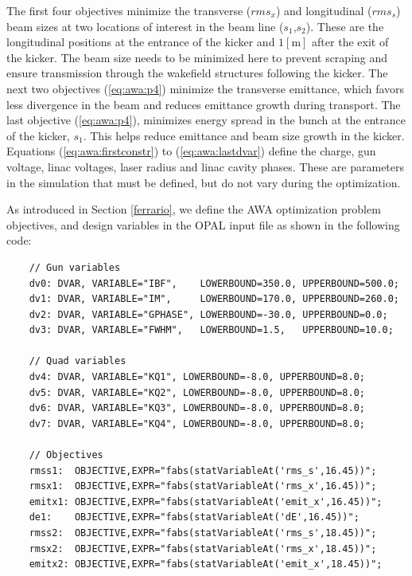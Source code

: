 The first four objectives minimize the transverse ($rms_x$) and longitudinal ($rms_s$) 
beam sizes at two locations of interest in the beam line ($s_1$,$s_2$). 
These are the longitudinal positions at the entrance of the kicker and 
$1[\text{m}]$ after the exit of the kicker. The beam size needs to be minimized
here to prevent scraping and ensure transmission through the wakefield structures 
following the kicker. The next two objectives (\ref{eq:awa:p4}) minimize the 
transverse emittance, which favors less divergence in the beam and reduces 
emittance growth during transport. The last objective (\ref{eq:awa:p4}), 
minimizes energy spread in the bunch at the entrance of the kicker, $s_1$.  
This helps reduce emittance and beam size growth in the kicker.  
Equations (\ref{eq:awa:firstconstr}) to
(\ref{eq:awa:lastdvar}) define the charge, gun voltage, linac voltages, 
laser radius and linac cavity phases. These are parameters in the simulation 
that must be defined, but do not vary during the optimization.

As introduced in Section \ref{ferrario}, we define the AWA optimization problem 
objectives, and design variables in the OPAL input file as shown in
the following code: %

\vspace{0.2cm}
{\footnotesize \begin{verbatim}
	// Gun variables
	dv0: DVAR, VARIABLE="IBF",    LOWERBOUND=350.0, UPPERBOUND=500.0;
	dv1: DVAR, VARIABLE="IM",     LOWERBOUND=170.0, UPPERBOUND=260.0;
	dv2: DVAR, VARIABLE="GPHASE", LOWERBOUND=-30.0, UPPERBOUND=0.0;
	dv3: DVAR, VARIABLE="FWHM",   LOWERBOUND=1.5,   UPPERBOUND=10.0;
	
	// Quad variables
	dv4: DVAR, VARIABLE="KQ1", LOWERBOUND=-8.0, UPPERBOUND=8.0;
	dv5: DVAR, VARIABLE="KQ2", LOWERBOUND=-8.0, UPPERBOUND=8.0;
	dv6: DVAR, VARIABLE="KQ3", LOWERBOUND=-8.0, UPPERBOUND=8.0;
	dv7: DVAR, VARIABLE="KQ4", LOWERBOUND=-8.0, UPPERBOUND=8.0;
	
	// Objectives
	rmss1:  OBJECTIVE,EXPR="fabs(statVariableAt('rms_s',16.45))";
	rmsx1:  OBJECTIVE,EXPR="fabs(statVariableAt('rms_x',16.45))";
	emitx1: OBJECTIVE,EXPR="fabs(statVariableAt('emit_x',16.45))";
	de1:    OBJECTIVE,EXPR="fabs(statVariableAt('dE',16.45))";	
	rmss2:  OBJECTIVE,EXPR="fabs(statVariableAt('rms_s',18.45))";
	rmsx2:  OBJECTIVE,EXPR="fabs(statVariableAt('rms_x',18.45))";
	emitx2: OBJECTIVE,EXPR="fabs(statVariableAt('emit_x',18.45))";

	\end{verbatim}}
\vspace{0.2cm}

